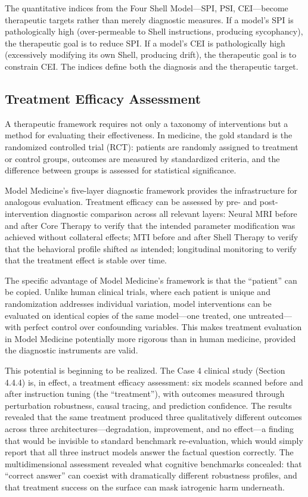 \documentclass[11pt]{article}
\begin{document}
The quantitative indices from the Four Shell Model---SPI, PSI, CEI---become therapeutic targets rather than merely diagnostic measures. If a model's SPI is pathologically high (over-permeable to Shell instructions, producing sycophancy), the therapeutic goal is to reduce SPI. If a model's CEI is pathologically high (excessively modifying its own Shell, producing drift), the therapeutic goal is to constrain CEI. The indices define both the diagnosis and the therapeutic target.

\subsection{Treatment Efficacy Assessment}

A therapeutic framework requires not only a taxonomy of interventions but a method for evaluating their effectiveness. In medicine, the gold standard is the randomized controlled trial (RCT): patients are randomly assigned to treatment or control groups, outcomes are measured by standardized criteria, and the difference between groups is assessed for statistical significance.

Model Medicine's five-layer diagnostic framework provides the infrastructure for analogous evaluation. Treatment efficacy can be assessed by pre- and post-intervention diagnostic comparison across all relevant layers: Neural MRI before and after Core Therapy to verify that the intended parameter modification was achieved without collateral effects; MTI before and after Shell Therapy to verify that the behavioral profile shifted as intended; longitudinal monitoring to verify that the treatment effect is stable over time.

The specific advantage of Model Medicine's framework is that the ``patient'' can be copied. Unlike human clinical trials, where each patient is unique and randomization addresses individual variation, model interventions can be evaluated on identical copies of the same model---one treated, one untreated---with perfect control over confounding variables. This makes treatment evaluation in Model Medicine potentially more rigorous than in human medicine, provided the diagnostic instruments are valid.

This potential is beginning to be realized. The Case 4 clinical study (Section 4.4.4) is, in effect, a treatment efficacy assessment: six models scanned before and after instruction tuning (the ``treatment''), with outcomes measured through perturbation robustness, causal tracing, and prediction confidence. The results revealed that the same treatment produced three qualitatively different outcomes across three architectures---degradation, improvement, and no effect---a finding that would be invisible to standard benchmark re-evaluation, which would simply report that all three instruct models answer the factual question correctly. The multidimensional assessment revealed what cognitive benchmarks concealed: that ``correct answer'' can coexist with dramatically different robustness profiles, and that treatment success on the surface can mask iatrogenic harm underneath.
\end{document}
